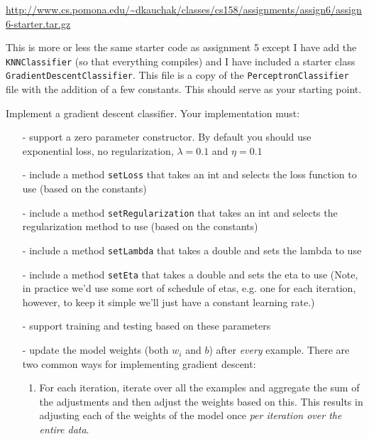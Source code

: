 \documentclass[11pt]{article}
\begin{document}
{\footnotesize
\url{http://www.cs.pomona.edu/~dkauchak/classes/cs158/assignments/assign6/assign6-starter.tar.gz}
}

This is more or less the same starter code as assignment 5 except I have add the \texttt{KNNClassifier} (so that everything compiles) and I have included a starter class \texttt{GradientDescentClassifier}.  This file is a copy of the \texttt{PerceptronClassifier} file with the addition of a few constants.  This should serve as your starting point.

Implement a gradient descent classifier.  Your implementation must:

\begin{itemize}

\item[-] support a zero parameter constructor.  By default you should use exponential loss, no regularization, $\lambda = 0.1$ and $\eta=0.1$

\item[-] include a method \texttt{setLoss} that takes an int and selects the loss function to use (based on the constants)

\item[-] include a method \texttt{setRegularization} that takes an int and selects the regularization method to use (based on the constants)

\item[-] include a method \texttt{setLambda} that takes a double and sets the lambda to use

\item[-] include a method \texttt{setEta} that takes a double and sets the eta to use (Note, in practice we'd use some sort of schedule of etas, e.g. one for each iteration, however, to keep it simple we'll just have a constant learning rate.)

\item[-] support training and testing based on these parameters

\item[-] update the model weights (both $w_i$ and $b$) after \emph{every} example.  There are two common ways for implementing gradient descent:

\begin{enumerate}

\item For each iteration, iterate over all the examples and aggregate the sum of the adjustments and then adjust the weights based on this.  This results in adjusting each of the weights of the model once \emph{per iteration over the entire data}.


\end{enumerate}
\end{itemize}
\end{document}
